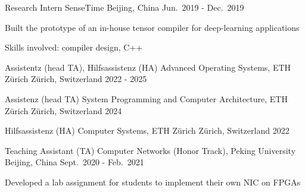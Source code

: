 
\begin{cventries}
    \cventry
    {Research Intern}
    {SenseTime}
    {Beijing, China}
    {Jun.\ 2019 - Dec.\ 2019}
    {
        \begin{cvitems}
            \item {Built the prototype of an in-house tensor compiler for
                deep-learning applications}
            \item {Skills involved: compiler design, C++}
        \end{cvitems}
    }
\end{cventries}


\begin{cventries}
    \cventry
    {Assistentz (head TA), Hilfsassistenz (HA)}
    {Advanced Operating Systems, ETH Z\"urich}
    {Z\"urich, Switzerland}
    {2022 - 2025}
    {}

    \cventry
    {Assistenz (head TA)}
    {System Programming and Computer Architecture, ETH Z\"urich}
    {Z\"urich, Switzerland}
    {2024}
    {}

    \cventry
    {Hilfsassistenz (HA)}
    {Computer Systems, ETH Z\"urich}
    {Z\"urich, Switzerland}
    {2022}
    {}

    \cventry
    {Teaching Assistant (TA)}
    {Computer Networks (Honor Track), Peking University}
    {Beijing, China}
    {Sept.\ 2020 - Feb.\ 2021}
    {
        \begin{cvitems}
            \item {Developed a lab assignment for students to implement their
                own NIC on FPGAs}
        \end{cvitems}
    }
\end{cventries}
